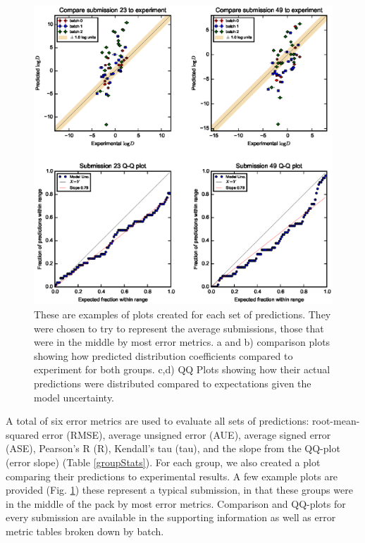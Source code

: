 \begin{figure} %
\includegraphics{ExamplePlots.eps}
\caption{These are examples of plots created for each set of predictions. They were chosen to try to represent the average submissions, those that were in the middle by most error metrics. a and b) comparison plots showing how predicted distribution coefficients compared to experiment for both groups. c,d) QQ Plots showing how their actual predictions were distributed compared to expectations given the model uncertainty.}
\label{examplePlots}       %
\end{figure}

A total of six error metrics are used to evaluate all sets of predictions: root-mean-squared error (RMSE), average unsigned error (AUE), average signed error (ASE), Pearson's R (R), Kendall's tau (tau), and the slope from the QQ-plot (error slope) (Table \ref{groupStats}). 
For each group, we also created a plot comparing their predictions to experimental results.
A few example plots are provided (Fig. \ref{examplePlots}) these represent a typical submission, in that these groups were in the middle of the pack by most error metrics. 
Comparison and QQ-plots for every submission are available in the supporting information as well as error metric tables broken down by batch. 

